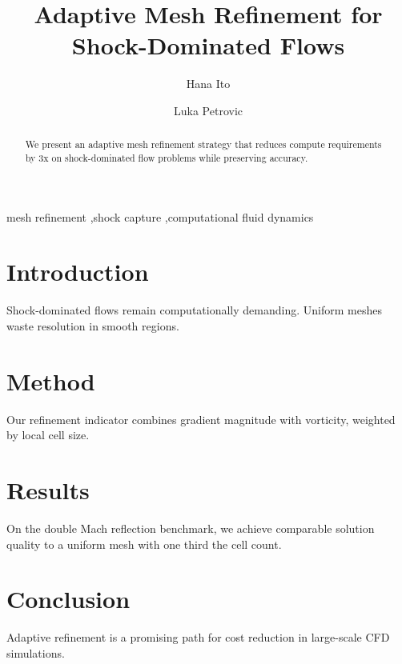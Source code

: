\documentclass[preprint,12pt]{elsarticle}
\begin{document}
\begin{frontmatter}

\title{Adaptive Mesh Refinement for Shock-Dominated Flows}

\author[lab1]{Hana Ito}
\author[lab2]{Luka Petrovic}

\begin{abstract}
We present an adaptive mesh refinement strategy that reduces compute requirements by 3x on shock-dominated flow problems while preserving accuracy.
\end{abstract}

\begin{keyword}
mesh refinement \sep shock capture \sep computational fluid dynamics
\end{keyword}

\end{frontmatter}

\section{Introduction}
Shock-dominated flows remain computationally demanding. Uniform meshes waste resolution in smooth regions.

\section{Method}
Our refinement indicator combines gradient magnitude with vorticity, weighted by local cell size.

\section{Results}
On the double Mach reflection benchmark, we achieve comparable solution quality to a uniform mesh with one third the cell count.

\section{Conclusion}
Adaptive refinement is a promising path for cost reduction in large-scale CFD simulations.
\end{document}
